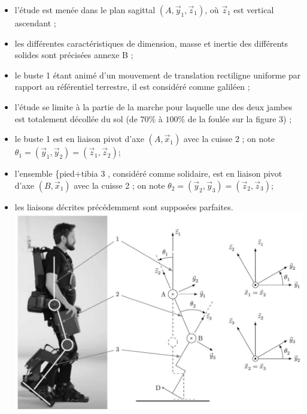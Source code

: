 \documentclass[10pt]{article}
\begin{document}
\begin{itemize}
  \item l'étude est menée dans le plan sagittal $\left(A, \vec{y}_{1}, \vec{z}_{1}\right)$, où $\vec{z}_{1}$ est vertical ascendant ;

  \item les différentes caractéristiques de dimension, masse et inertie des différents solides sont précisées annexe B ;

  \item le buste 1 étant animé d'un mouvement de translation rectiligne uniforme par rapport au référentiel terrestre, il est considéré comme galiléen ;

  \item l'étude se limite à la partie de la marche pour laquelle une des deux jambes est totalement décollée du sol (de $70 \%$ à $100 \%$ de la foulée sur la figure 3) ;

  \item le buste 1 est en liaison pivot d'axe $\left(A, \vec{x}_{1}\right)$ avec la cuisse 2 ; on note $\theta_{1}=\left(\vec{y}_{1}, \vec{y}_{2}\right)=\left(\vec{z}_{1}, \vec{z}_{2}\right)$;

  \item l'ensemble \{pied+tibia 3 , considéré comme solidaire, est en liaison pivot d'axe $\left(B, \vec{x}_{1}\right)$ avec la cuisse 2 ; on note $\theta_{2}=\left(\vec{y}_{2}, \vec{y}_{3}\right)=\left(\vec{z}_{2}, \vec{z}_{3}\right)$;

  \item les liaisons décrites précédemment sont supposées parfaites.
\includegraphics[max width=\textwidth, center]{2023_05_12_54c6a64d2ffce28d5c72g-03}

\end{itemize}
\end{document}
